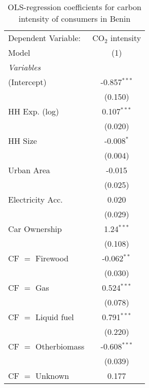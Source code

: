 
\begin{table}[htbp!]
   \centering
   \small
   \begin{adjustbox}{width = 1\textwidth, max height = 0.95\textheight, center}
      \begin{threeparttable}[b]
         \caption{\label{tab:OLS_1_BEN} OLS-regression coefficients for carbon intensity of consumers in Benin}
         \begin{tabular}{lc}
            \tabularnewline \midrule \midrule
            Dependent Variable: & CO$_{2}$ intensity\\  
            Model               & (1)\\  
            \midrule
            \emph{Variables}\\
            (Intercept)         & -0.857$^{***}$\\   
                                & (0.150)\\   
            HH Exp. (log)       & 0.107$^{***}$\\   
                                & (0.020)\\   
            HH Size             & -0.008$^{*}$\\   
                                & (0.004)\\   
            Urban Area          & -0.015\\   
                                & (0.025)\\   
            Electricity Acc.    & 0.020\\   
                                & (0.029)\\   
            Car Ownership       & 1.24$^{***}$\\   
                                & (0.108)\\   
            CF $=$ Firewood     & -0.062$^{**}$\\   
                                & (0.030)\\   
            CF $=$ Gas          & 0.524$^{***}$\\   
                                & (0.078)\\   
            CF $=$ Liquid fuel  & 0.791$^{***}$\\   
                                & (0.220)\\   
            CF $=$ Otherbiomass & -0.608$^{***}$\\   
                                & (0.039)\\   
            CF $=$ Unknown      & 0.177\\   

\end{tabular}
\end{threeparttable}
\end{adjustbox}
\end{table}
